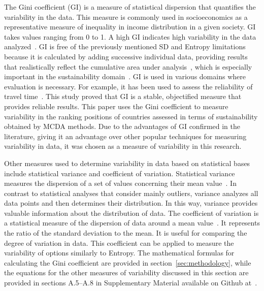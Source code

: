 \documentclass[5p,times]{elsarticle}
\newcounter{example}[section]
\begin{document}
The Gini coefficient (GI) is a measure of statistical dispersion that quantifies the variability in the data. This measure is commonly used in socioeconomics as a representative measure of inequality in income distribution in a given society. GI takes values ranging from 0 to 1. A high GI indicates high variability in the data analyzed~\cite{lai2020sustainable}. GI is free of the previously mentioned SD and Entropy limitations because it is calculated by adding successive individual data, providing results that realistically reflect the cumulative area under analysis~\cite{biro2020gintropy}, which is especially important in the sustainability domain~\cite{long2019economic}. GI is used in various domains where evaluation is necessary. For example, it has been used to assess the reliability of travel time~\cite{lee2019gini}. This study proved that GI is a stable, objectified measure that provides reliable results. This paper uses the Gini coefficient to measure variability in the ranking positions of countries assessed in terms of sustainability obtained by MCDA methods. Due to the advantages of GI confirmed in the literature, giving it an advantage over other popular techniques for measuring variability in data, it was chosen as a measure of variability in this research.

Other measures used to determine variability in data based on statistical bases include statistical variance and coefficient of variation. Statistical variance measures the dispersion of a set of values concerning their mean value~\cite{rao2010subjective}. In contrast to statistical analyses that consider mainly outliers, variance analyzes all data points and then determines their distribution. In this way, variance provides valuable information about the distribution of data. The coefficient of variation is a statistical measure of the dispersion of data around a mean value~\cite{shuai2012new}. It represents the ratio of the standard deviation to the mean. It is useful for comparing the degree of variation in data. This coefficient can be applied to measure the variability of options similarly to Entropy. The mathematical formulas for calculating the Gini coefficient are provided in section~\ref{sec:methodology}, while the equations for the other measures of variability discussed in this section are provided in sections A.5--A.8 in Supplementary Material available on Github at~\cite{dariagithub2022}.
\end{document}
